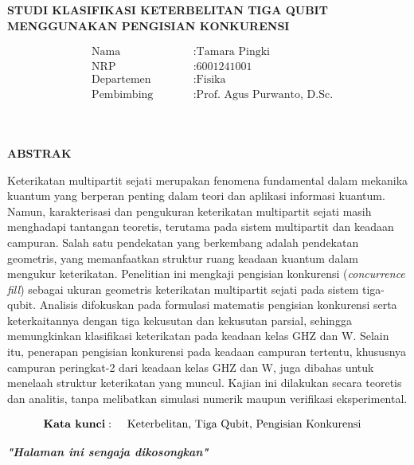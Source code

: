 \begin{center}
	\large{\textbf{STUDI KLASIFIKASI KETERBELITAN TIGA QUBIT 
MENGGUNAKAN PENGISIAN KONKURENSI}}
\end{center}
\begin{minipage}{4cm}
	\begin{align*}
		&\text{Nama} \qquad &&: \text{Tamara Pingki} \\
		&\text{NRP} \qquad &&: \text{6001241001} \\
		&\text{Departemen} \qquad &&: \text{Fisika} \\
		&\text{Pembimbing} \qquad &&: \text{Prof. Agus Purwanto, D.Sc.} \\
	\end{align*}
\end{minipage} \\
\begin{center}
	\large\textbf{ABSTRAK} \\  
\end{center}
Keterikatan multipartit sejati merupakan fenomena fundamental dalam mekanika kuantum yang berperan penting dalam teori dan aplikasi informasi kuantum. Namun, karakterisasi dan pengukuran keterikatan multipartit sejati masih menghadapi tantangan teoretis, terutama pada sistem multipartit dan keadaan campuran. Salah satu pendekatan yang berkembang adalah pendekatan geometris, yang memanfaatkan struktur ruang keadaan kuantum dalam mengukur keterikatan. Penelitian ini mengkaji pengisian konkurensi (\textit{concurrence fill}) sebagai ukuran geometris keterikatan multipartit sejati pada sistem tiga-qubit. Analisis difokuskan pada formulasi matematis pengisian konkurensi serta keterkaitannya dengan tiga kekusutan dan kekusutan parsial, sehingga memungkinkan klasifikasi keterikatan pada keadaan kelas GHZ dan W. Selain itu, penerapan pengisian konkurensi pada keadaan campuran tertentu, khususnya campuran peringkat-2 dari keadaan kelas GHZ dan W, juga dibahas untuk menelaah struktur keterikatan yang muncul. Kajian ini dilakukan secara teoretis dan analitis, tanpa melibatkan simulasi numerik maupun verifikasi eksperimental.

\noindent
\begin{minipage}{1cm}
	\begin{align*}
		\text{\textbf{Kata kunci}}:\hspace{5mm}&\text{Keterbelitan, Tiga Qubit, Pengisian Konkurensi}%
	\end{align*}
\end{minipage}

\newpage
\thispagestyle{empty}
\begin{center}
	\vspace*{\fill}
	\textit{\textbf{"Halaman ini sengaja dikosongkan"}}
	\vspace*{\fill}
\end{center}
\pagebreak